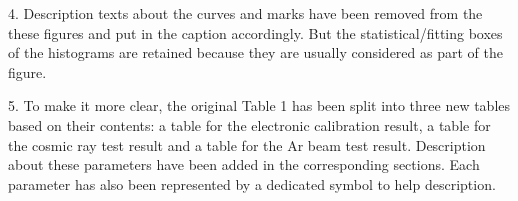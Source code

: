 \documentclass[]{article}
\begin{document}
4. Description texts about the curves and marks have been removed from the these figures and put in the caption accordingly. But the statistical/fitting boxes of the histograms are retained because they are usually considered as part of the figure.

5. To make it more clear, the original Table 1 has been split into three new tables based on their contents: a table for the electronic  calibration result, a table for the cosmic ray test result and a table for the Ar beam test result. Description about these parameters have been added in the corresponding sections. Each parameter has also been represented by a dedicated symbol to help description.
\end{document}
